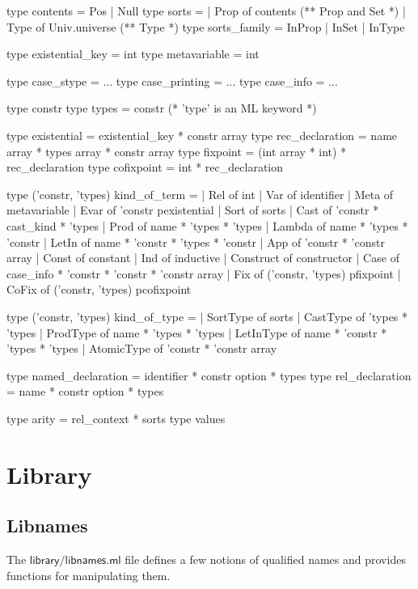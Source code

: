 \documentclass[a4paper,oneside]{book}
\newcommand{\m}[1]{\ensuremath{\mathsf{#1}}}
\begin{document}
\begin{code}
type contents = Pos | Null
type sorts =
  | Prop of contents       (** Prop and Set *)
  | Type of Univ.universe  (** Type *)
type sorts_family = InProp | InSet | InType

type existential_key = int
type metavariable = int

type case_stype = ...
type case_printing = ...
type case_info = ...

type constr
type types = constr   (* 'type' is an ML keyword *)

type existential = existential_key * constr array
type rec_declaration = name array * types array * constr array
type fixpoint = (int array * int) * rec_declaration
type cofixpoint = int * rec_declaration

type ('constr, 'types) kind_of_term =
  | Rel       of int
  | Var       of identifier
  | Meta      of metavariable
  | Evar      of 'constr pexistential
  | Sort      of sorts
  | Cast      of 'constr * cast_kind * 'types
  | Prod      of name * 'types * 'types
  | Lambda    of name * 'types * 'constr
  | LetIn     of name * 'constr * 'types * 'constr
  | App       of 'constr * 'constr array
  | Const     of constant
  | Ind       of inductive
  | Construct of constructor
  | Case      of case_info * 'constr * 'constr * 'constr array
  | Fix       of ('constr, 'types) pfixpoint
  | CoFix     of ('constr, 'types) pcofixpoint

type ('constr, 'types) kind_of_type =
  | SortType   of sorts
  | CastType   of 'types * 'types
  | ProdType   of name * 'types * 'types
  | LetInType  of name * 'constr * 'types * 'types
  | AtomicType of 'constr * 'constr array

type named_declaration = identifier * constr option * types
type rel_declaration = name * constr option * types

type arity = rel_context * sorts
type values
\end{code}

\newpage

\section{Library}

\subsection{Libnames}

The \m{library/libnames.ml} file defines a few notions of qualified
names and provides functions for manipulating them.
\end{document}
